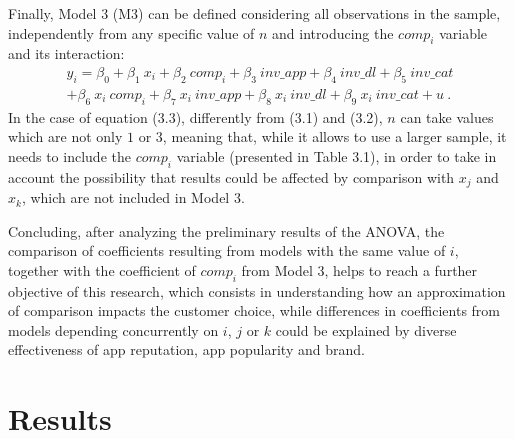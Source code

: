 Finally, Model 3 (M3) can be defined considering all observations in the sample, independently from any specific value of $n$ and introducing the $comp_i$ variable and its interaction:
    \begin{equation}
        \begin{split}
		y_{i} = \beta_0 + \beta_1 ~ x_{i} + \beta_2 ~ comp_i +  \beta_3 ~  inv\_app + \beta_4 ~ inv\_dl + \beta_5 ~ inv\_cat \\
        + \beta_6 ~ x_{i} ~ comp_i + \beta_7  ~ x_{i} ~ inv\_app + \beta_8  ~ x_{i} ~ inv\_dl + \beta_9  ~ x_{i} ~ inv\_cat + u ~\text{.}
        \end{split}
    \end{equation}
In the case of equation (3.3), differently from (3.1) and (3.2), $n$ can take values which are not only $1$ or $3$, meaning that, while it allows to use a larger sample, it needs to include the $comp_i$ variable (presented in Table 3.1), in order to take in account the possibility that results could be affected by comparison with $x_j$ and $x_k$, which are not included in Model 3.  

Concluding, after analyzing the preliminary results of the ANOVA, the comparison of coefficients resulting from models with the same value of $i$, together with the coefficient of $comp_i$ from Model 3, helps to reach a further objective of this research, which consists in understanding how an approximation of comparison impacts the customer choice, while differences in coefficients from models depending concurrently on $i$, $j$ or $k$ could be explained by diverse effectiveness of app reputation, app popularity and brand.

\section{Results}

